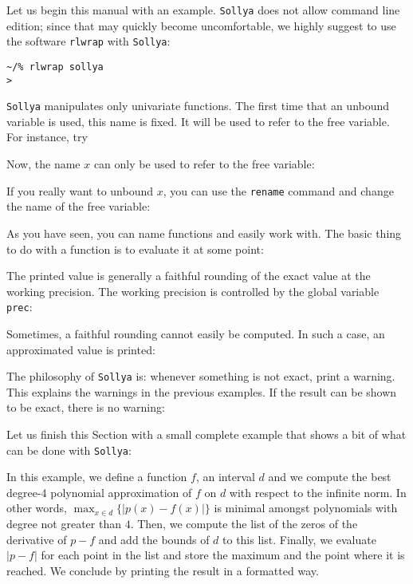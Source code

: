 \documentclass[a4paper]{article}
\newcommand{\com}[1]{\texttt{#1}}
\newcommand{\sollya}{\texttt{Sollya}\xspace}
\newcommand{\rlwrap}{\texttt{rlwrap}\xspace}
\begin{document}
Let us begin this manual with an example. \sollya does not allow command line edition; since that may quickly become uncomfortable, we highly suggest to use the software \rlwrap with \sollya:

\begin{center}\begin{minipage}{15cm}\begin{Verbatim}[frame=single]
~/% rlwrap sollya
>
\end{Verbatim}
\end{minipage}\end{center}

\sollya manipulates only univariate functions. The first time that an unbound variable is used, this name is fixed. It will be used to refer to the free variable. For instance, try



Now, the name $x$ can only be used to refer to the free variable:



If you really want to unbound $x$, you can use the \com{rename} command and change the name of the free variable:



As you have seen, you can name functions and easily work with. The basic thing to do with a function is to evaluate it at some point:



The printed value is generally a faithful rounding of the exact value at the working precision. The working precision is controlled by the global variable \com{prec}:



Sometimes, a faithful rounding cannot easily be computed. In such a case, an approximated value is printed:



The philosophy of \sollya is: whenever something is not exact, print a warning. This explains the warnings in the previous examples. If the result can be shown to be exact, there is no warning:



Let us finish this Section with a small complete example that shows a bit of what can be done with \sollya:



In this example, we define a function $f$, an interval $d$ and we compute the best degree-4 polynomial approximation of $f$ on $d$ with respect to the infinite norm. In other words, $\max_{x \in d} \{|p(x)-f(x)|\}$ is minimal amongst polynomials with degree not greater than $4$. Then, we compute the list of the zeros of the derivative of $p-f$ and add the bounds of $d$ to this list. Finally, we evaluate $|p-f|$ for each point in the list and store the maximum and the point where it is reached. We conclude by printing the result in a formatted way.
\end{document}
